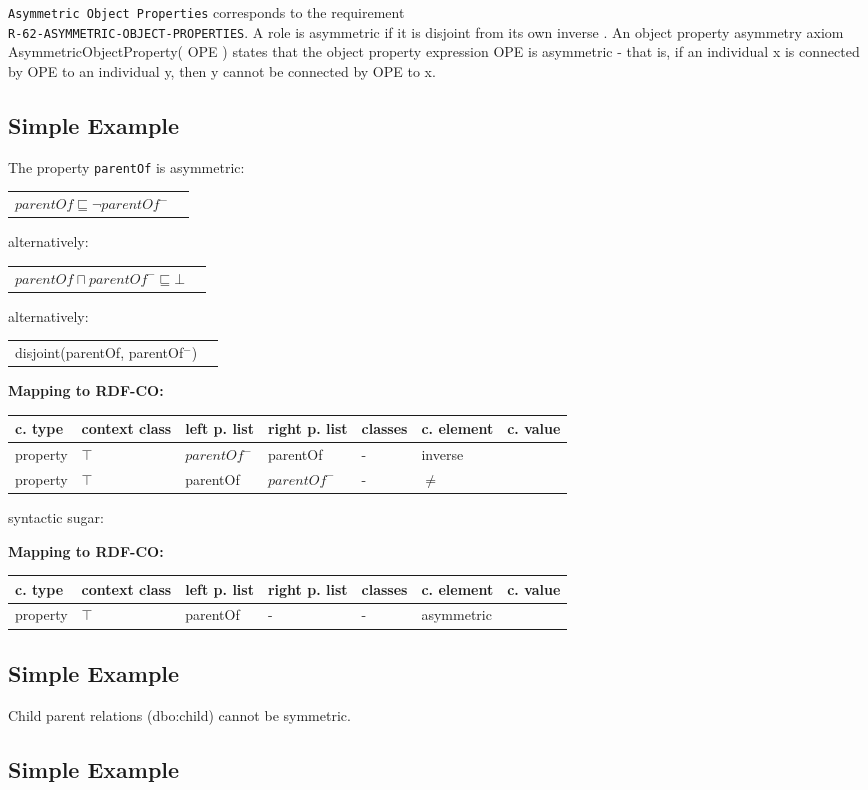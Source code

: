 \documentclass{llncs}
\newcommand{\ms}[1]{\texttt{#1}}
\newenvironment{gcotable}{
  \scriptsize
  \sffamily
  \vspace{0cm}
	\begin{center}
	\textbf{\vspace{0.4cm}Mapping to RDF-CO:} \\
  \begin{tabular}{l|l|l|l|l|l|l}
	\hline
  \textbf{c. type} & \textbf{context class} & \textbf{left p. list} & \textbf{right p. list} & \textbf{classes} & \textbf{c. element} & \textbf{c. value} \\
  \hline

}{
  \hline
  \end{tabular}
	\end{center}
}
\newenvironment{DL}{
  \vspace{0cm}
	\begin{center}
  \begin{tabular}{r l}

}{
  \end{tabular}
	\end{center}
}
\begin{document}
\ms{Asymmetric Object Properties} corresponds to the requirement \\
\ms{R-62-ASYMMETRIC-OBJECT-PROPERTIES}.
A role is asymmetric if it is disjoint from its own inverse \cite{Kroetzsch2012}.
An object property asymmetry axiom AsymmetricObjectProperty( OPE ) states that the object property expression OPE is asymmetric - that is, if an individual x is connected by OPE to an individual y, then y cannot be connected by OPE to x. 

\subsection{Simple Example}

The property \ms{parentOf} is asymmetric:

\begin{DL}
$parentOf \sqsubseteq \neg parentOf^{-}$ 
\end{DL}

alternatively:

\begin{DL}
$parentOf \sqcap parentOf^{-} \sqsubseteq \bot$ 
\end{DL}

alternatively:

\begin{DL}
disjoint(parentOf, parentOf$^{-}$)
\end{DL}

\begin{gcotable}
property & $\top$ & $parentOf^{-}$ & parentOf & - & inverse \\
property & $\top$ & parentOf & $parentOf^{-}$ & - & $\ne$ \\
\end{gcotable}

syntactic sugar:

\begin{gcotable}
property & $\top$ & parentOf & - & - & asymmetric \\
\end{gcotable}

\subsection{Simple Example}

Child parent relations (dbo:child) cannot be symmetric.

\subsection{Simple Example}
\end{document}
